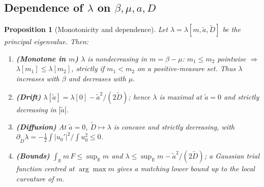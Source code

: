 \documentclass{amsart}
\newtheorem{proposition}{Proposition}
\theoremstyle{definition}
\newcommand{\R}{\mathbb{R}}
\begin{document}
\subsection*{Dependence of $\lambda$ on $\beta,\mu,a,D$}

\begin{proposition}[Monotonicity and dependence]\label{prop:dependence}
Let $\lambda=\lambda[m,\widetilde a,\widetilde D]$ be the principal eigenvalue. Then:
\begin{enumerate}
\item[\rm(M1)] \textbf{(Monotone in $m$)} $\lambda$ is nondecreasing in $m=\beta-\mu$: $m_1\le m_2$
pointwise $\Rightarrow$ $\lambda[m_1]\le\lambda[m_2]$, strictly if $m_1<m_2$ on a positive-measure
set. Thus $\lambda$ increases with $\beta$ and decreases with $\mu$.
\item[\rm(M2)] \textbf{(Drift)} $\lambda[\widetilde a]=\lambda[0]-\widetilde a^2/(2\widetilde D)$;
hence $\lambda$ is maximal at $\widetilde a=0$ and strictly decreasing in $|\widetilde a|$.
\item[\rm(M3)] \textbf{(Diffusion)} At $\widetilde a=0$, $\widetilde D\mapsto\lambda$ is concave and
strictly decreasing, with
$\partial_{\widetilde D}\lambda=-\tfrac12\int|u_0'|^2/\!\int u_0^2\le0$.
\item[\rm(M4)] \textbf{(Bounds)} $\displaystyle\int_\R m\,F\le\sup_\R m$ and
$\lambda\le\sup_\R m-\widetilde a^2/(2\widetilde D)$; a Gaussian trial function centred at
$\arg\max m$ gives a matching lower bound up to the local curvature of $m$.
\end{enumerate}
\end{proposition}
\end{document}
